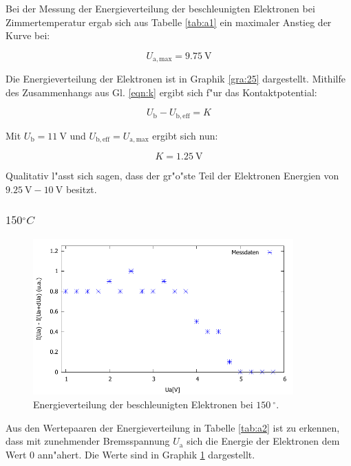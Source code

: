 Bei der Messung der Energieverteilung der beschleunigten Elektronen bei Zimmertemperatur ergab sich aus Tabelle \ref{tab:a1} ein maximaler Anstieg der Kurve bei:

\begin{equation}
	U_\mathrm{a,max} = \SI{9.75}{\volt}
\end{equation}

\clearpage

Die Energieverteilung der Elektronen ist in Graphik \ref{gra:25} dargestellt.
Mithilfe des Zusammenhangs aus Gl. \eqref{eqn:k} ergibt sich f"ur das Kontaktpotential:

\begin{equation}
	U_\mathrm{b} - U_\mathrm{b,eff} = K
\end{equation}

Mit $U_\mathrm{b} = \SI{11}{\volt}$ und $U_\mathrm{b,eff} = U_\mathrm{a,max}$ ergibt sich nun:

\begin{equation}
	K = \SI{1.25}{\volt}
\end{equation}

Qualitativ l"asst sich sagen, dass der gr"o"ste Teil der Elektronen Energien von $\SI{9.25}{\volt} - \SI{10}{\volt}$ besitzt.

\subsubsection{$\si{150}{^\circ C}$} %
\label{sub:_sis}



\begin{figure}[!h]
	\centering
	\includegraphics[width = 10cm]{img/t150.pdf}
	\caption{Energieverteilung der beschleunigten Elektronen bei $\SI{150}{^\circ}$.}
	\label{gra:150}
\end{figure}

Aus den Wertepaaren der Energieverteilung in Tabelle \ref{tab:a2} ist zu erkennen, dass mit zunehmender Bremsspannung $U_\mathrm{a}$ sich die Energie der Elektronen dem Wert $0$ ann"ahert.
Die Werte sind in Graphik \ref{gra:150} dargestellt.

